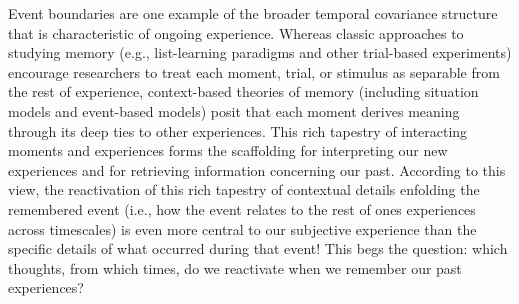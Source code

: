 \documentclass{article}
\begin{document}
Event boundaries are one example of the broader temporal covariance structure that is characteristic of ongoing experience.  Whereas classic approaches to studying memory (e.g., list-learning paradigms and other trial-based experiments) encourage researchers to treat each moment, trial, or stimulus as separable from the rest of experience, context-based theories of memory (including situation models and event-based models) posit that each moment derives meaning through its deep ties to other experiences.  This rich tapestry of interacting moments and experiences forms the scaffolding for interpreting our new experiences and for retrieving information concerning our past.  According to this view, the reactivation of this rich tapestry of contextual details enfolding the remembered event (i.e., how the event relates to the rest of ones experiences across timescales) is even more central to our subjective experience than the specific details of what occurred during that event!  This begs the question: which thoughts, from which times, do we reactivate when we remember our past experiences?
\end{document}

